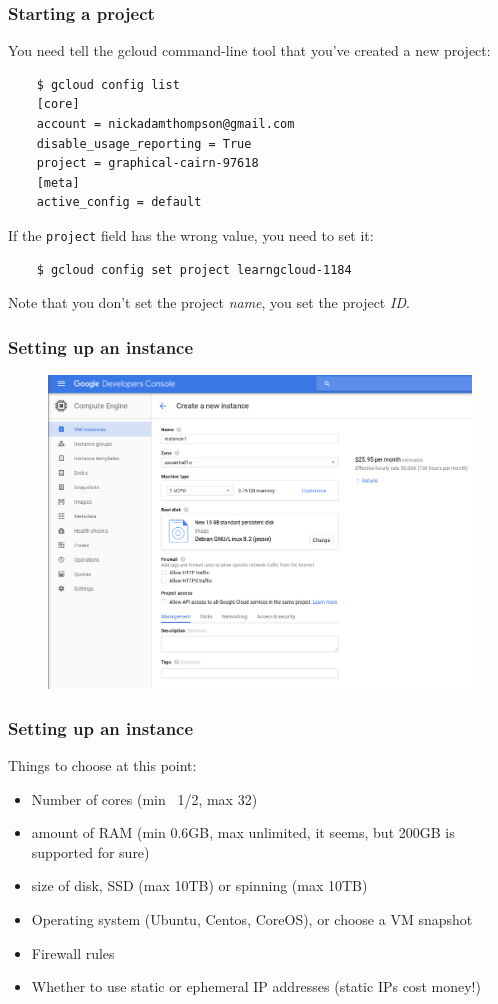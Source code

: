 \documentclass[9pt]{beamer}
\begin{document}
\begin{frame}[fragile]
  \frametitle{Starting a project}
  You need tell the gcloud command-line tool that you've created a new project:
  \begin{verbatim}
    $ gcloud config list
    [core]
    account = nickadamthompson@gmail.com
    disable_usage_reporting = True
    project = graphical-cairn-97618 
    [meta]
    active_config = default
  \end{verbatim}
  If the \texttt{project} field has the wrong value, you need to set it:
  \begin{verbatim}
    $ gcloud config set project learngcloud-1184
  \end{verbatim}
  Note that you don't set the project \emph{name}, you set the project \emph{ID}.
\end{frame}


\begin{frame}[fragile]
  \frametitle{Setting up an instance}
  \begin{figure}
    \includegraphics[scale=0.3]{figures/CreateInstance.png}
  \end{figure}
\end{frame}

\begin{frame}[fragile]
  \frametitle{Setting up an instance}
  Things to choose at this point:
  \pause
  \begin{itemize}
  \item Number of cores (min ~1/2, max 32)
    \pause
  \item amount of RAM (min 0.6GB, max unlimited, it seems, but 200GB is supported for sure)
    \pause
  \item size of disk, SSD (max 10TB) or spinning (max 10TB) 
    \pause
  \item Operating system (Ubuntu, Centos, CoreOS), or choose a VM snapshot
    \pause
  \item Firewall rules
    \pause
  \item Whether to use static or ephemeral IP addresses (static IPs cost money!)
  \end{itemize}
\end{frame}
\end{document}
